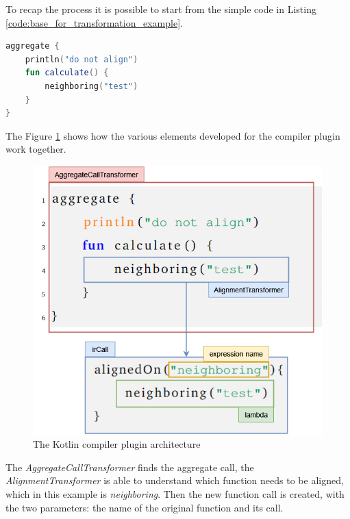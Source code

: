 To recap the process it is possible to start from the simple code in Listing \ref{code:base_for_transformation_example}.
\begin{lstlisting}[caption={Generation goal to handle the alignment of Listing \ref{code:first_alignment_code_example}}, captionpos=b, language=Kotlin, label={code:base_for_transformation_example}]
aggregate {
    println("do not align")
    fun calculate() {
        neighboring("test")
    }
}
\end{lstlisting}
The Figure \ref{fig:ir_trasformation_with_code_elements} shows how the various elements developed for the compiler plugin work together.
\begin{figure}[!ht]
    \centering
    \includegraphics[scale=0.65]{document/chapters/3-alignment/images/ir_trasformation_with_code_elements.png}
    \caption{The Kotlin compiler plugin architecture \cite{compiler_plugins_jetbrains}}
    \label{fig:ir_trasformation_with_code_elements}
\end{figure}
The \textit{AggregateCallTransformer} finds the aggregate call, the \textit{AlignmentTransformer} is able to understand which function needs to be aligned, which in this example is \textit{neighboring}. Then the new function call is created, with the two parameters: the name of the original function and its call.
